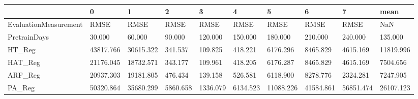 \begin{tabular}{llllllllll}
\toprule
{} &         0 &         1 &        2 &        3 &        4 &         5 &         6 &         7 &      mean \\
\midrule
EvaluationMeasurement &      RMSE &      RMSE &     RMSE &     RMSE &     RMSE &      RMSE &      RMSE &      RMSE &       NaN \\
PretrainDays          &    30.000 &    60.000 &   90.000 &  120.000 &  150.000 &   180.000 &   210.000 &   240.000 &   135.000 \\
HT\_Reg                & 43817.766 & 30615.322 &  341.537 &  109.825 &  418.221 &  6176.296 &  8465.829 &  4615.169 & 11819.996 \\
HAT\_Reg               & 21176.045 & 18732.571 &  343.177 &  109.961 &  418.205 &  6176.287 &  8465.829 &  4615.169 &  7504.656 \\
ARF\_Reg               & 20937.303 & 19181.805 &  476.434 &  139.158 &  526.581 &  6118.900 &  8278.776 &  2324.281 &  7247.905 \\
PA\_Reg                & 50320.864 & 35680.299 & 5860.658 & 1336.079 & 6134.523 & 11088.226 & 41584.861 & 56851.474 & 26107.123 \\
\bottomrule
\end{tabular}

